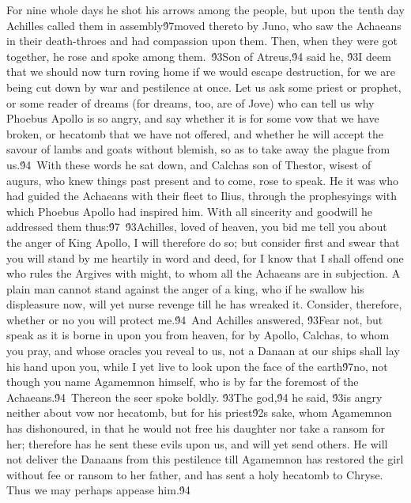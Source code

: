 {For nine whole days he shot his arrows among the people, but upon the tenth day Achilles called them in assembly\'97moved thereto by Juno, who saw the Achaeans in their death-throes and had compassion upon them. Then, when they were got together, he rose and spoke among them.\
\'93Son of Atreus,\'94 said he, \'93I deem that we should now turn roving home if we would escape destruction, for we are being cut down by war and pestilence at once. Let us ask some priest or prophet, or some reader of dreams (for dreams, too, are of Jove) who can tell us why Phoebus Apollo is so angry, and say whether it is for some vow that we have broken, or hecatomb that we have not offered, and whether he will accept the savour of lambs and goats without blemish, so as to take away the plague from us.\'94\
With these words he sat down, and Calchas son of Thestor, wisest of augurs, who knew things past present and to come, rose to speak. He it was who had guided the Achaeans with their fleet to Ilius, through the prophesyings with which Phoebus Apollo had inspired him. With all sincerity and goodwill he addressed them thus:\'97\
\'93Achilles, loved of heaven, you bid me tell you about the anger of King Apollo, I will therefore do so; but consider first and swear that you will stand by me heartily in word and deed, for I know that I shall offend one who rules the Argives with might, to whom all the Achaeans are in subjection. A plain man cannot stand against the anger of a king, who if he swallow his displeasure now, will yet nurse revenge till he has wreaked it. Consider, therefore, whether or no you will protect me.\'94\
And Achilles answered, \'93Fear not, but speak as it is borne in upon you from heaven, for by Apollo, Calchas, to whom you pray, and whose oracles you reveal to us, not a Danaan at our ships shall lay his hand upon you, while I yet live to look upon the face of the earth\'97no, not though you name Agamemnon himself, who is by far the foremost of the Achaeans.\'94\
Thereon the seer spoke boldly. \'93The god,\'94 he said, \'93is angry neither about vow nor hecatomb, but for his priest\'92s sake, whom Agamemnon has dishonoured, in that he would not free his daughter nor take a ransom for her; therefore has he sent these evils upon us, and will yet send others. He will not deliver the Danaans from this pestilence till Agamemnon has restored the girl without fee or ransom to her father, and has sent a holy hecatomb to Chryse. Thus we may perhaps appease him.\'94\
}
